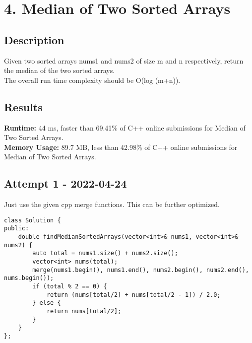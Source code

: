 \chapter{4. Median of Two Sorted Arrays}
\section{Description}
Given two sorted arrays nums1 and nums2 of size m and n respectively, return the median of the two sorted arrays.
\\
The overall run time complexity should be O(log (m+n)).
\section{Results}
\textbf{Runtime:} 44 ms, faster than 69.41\% of C++ online submissions for Median of Two Sorted Arrays.\\
\textbf{Memory Usage:} 89.7 MB, less than 42.98\% of C++ online submissions for Median of Two Sorted Arrays.\\
\newpage
\section{Attempt 1 - 2022-04-24}
Just use the given cpp merge functions. This can be further optimized.
\begin{lstlisting}
class Solution {
public:
    double findMedianSortedArrays(vector<int>& nums1, vector<int>& nums2) {
        auto total = nums1.size() + nums2.size();
        vector<int> nums(total);
        merge(nums1.begin(), nums1.end(), nums2.begin(), nums2.end(), nums.begin());
        if (total % 2 == 0) {
            return (nums[total/2] + nums[total/2 - 1]) / 2.0;
        } else {
            return nums[total/2];
        }
    }
};
\end{lstlisting}
